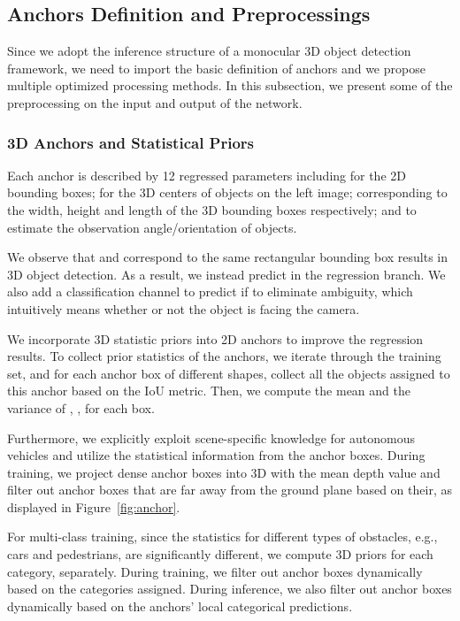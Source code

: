 \documentclass[letterpaper, 10 pt, conference]{ieeeconf}
\begin{document}
\subsection{Anchors Definition and Preprocessings}
\label{sec.mono_anchor}
Since we adopt the inference structure of a monocular 3D object detection framework, we need to import the basic definition of anchors and we propose multiple optimized processing methods.
In this subsection, we present some of the preprocessing on the input and output of the network.
\subsubsection{3D Anchors and Statistical Priors}

Each anchor is described by 12 regressed parameters including
 for the 2D bounding boxes;
 for the 3D centers of objects on the left image;
 corresponding to the width, height and length of the 3D bounding boxes respectively;
and  to estimate the observation angle/orientation of objects. 

We observe that   and  correspond to the same rectangular bounding box results in 3D object detection. As a result, we instead predict  in the regression branch.
We also add a classification channel to predict if  to eliminate ambiguity, which intuitively means whether or not the object is facing the camera.

We incorporate 3D statistic priors into 2D anchors to improve the regression results.
To collect prior statistics of the anchors, we iterate through the training set, and for each anchor box of different shapes, collect all the objects assigned to this anchor based on the IoU metric.
Then, we compute the mean and the variance of , ,  for each box. 

Furthermore, we explicitly exploit scene-specific knowledge for autonomous vehicles and utilize the statistical information from the anchor boxes.
During training, we project dense anchor boxes into 3D with the mean depth value  and filter out anchor boxes that are far away from the ground plane based on their, as displayed in Figure~\ref{fig:anchor}. 

 For multi-class training, since the statistics for different types of obstacles, e.g., cars and pedestrians, are significantly different, we compute 3D priors for each category, separately.
 During training, we filter out anchor boxes dynamically based on the categories assigned. During inference, we also filter out anchor boxes dynamically based on the anchors' local categorical predictions.
\end{document}
